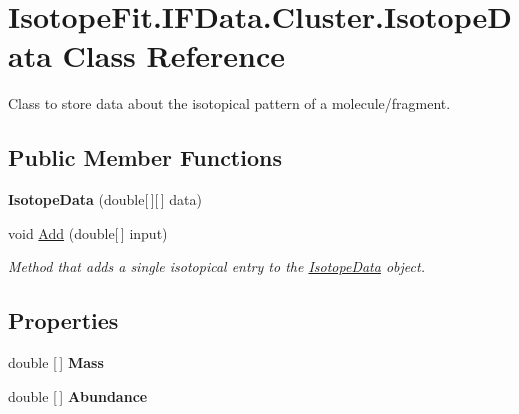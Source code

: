 \hypertarget{class_isotope_fit_1_1_i_f_data_1_1_cluster_1_1_isotope_data}{}\section{Isotope\+Fit.\+I\+F\+Data.\+Cluster.\+Isotope\+Data Class Reference}
\label{class_isotope_fit_1_1_i_f_data_1_1_cluster_1_1_isotope_data}


Class to store data about the isotopical pattern of a molecule/fragment.  


\subsection*{Public Member Functions}
\begin{DoxyCompactItemize}
\item 
\mbox{\label{class_isotope_fit_1_1_i_f_data_1_1_cluster_1_1_isotope_data_aed4fa29e98d7ffdde1a421848b0918f4}} 
{\bfseries Isotope\+Data} (double\mbox{[}$\,$\mbox{]}\mbox{[}$\,$\mbox{]} data)
\item 
void \hyperlink{class_isotope_fit_1_1_i_f_data_1_1_cluster_1_1_isotope_data_a6f2c01094e5e4d0f68166664adeedd99}{Add} (double\mbox{[}$\,$\mbox{]} input)
\begin{DoxyCompactList}\small\item\em Method that adds a single isotopical entry to the \hyperlink{class_isotope_fit_1_1_i_f_data_1_1_cluster_1_1_isotope_data}{Isotope\+Data} object. \end{DoxyCompactList}\end{DoxyCompactItemize}
\subsection*{Properties}
\begin{DoxyCompactItemize}
\item 
\mbox{\label{class_isotope_fit_1_1_i_f_data_1_1_cluster_1_1_isotope_data_afbbe848f60b456135ea622abf0644d1b}} 
double \mbox{[}$\,$\mbox{]} {\bfseries Mass}
\item 
\mbox{\label{class_isotope_fit_1_1_i_f_data_1_1_cluster_1_1_isotope_data_aa0f17487c627ed87bedc9cbd2670fc09}} 
double \mbox{[}$\,$\mbox{]} {\bfseries Abundance}
\end{DoxyCompactItemize}


